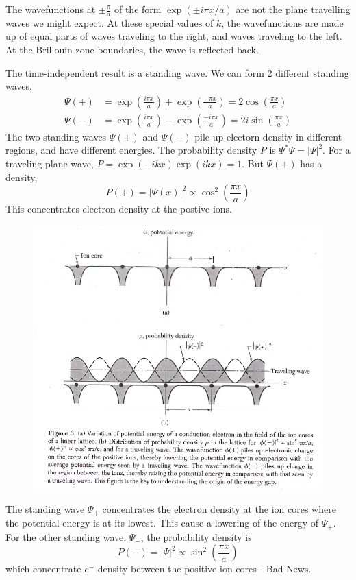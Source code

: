 \documentclass[a4paper, 11pt, normalem]{report}
\begin{document}
The wavefunctions at $\pm \frac{\pi}{a}$ of the form $\exp{(\pm i\pi x/a)}$ are not the plane travelling waves we might expect.
At these special values of $k$, the wavefunctions are made up of equal parts of waves traveling to the right, and waves traveling to the left. 
At the Brillouin zone boundaries, the wave is reflected back. 

The time-independent result is a standing wave.
We can form 2 different standing waves,
\begin{align}
    \Psi(+) &= \exp{\left(\frac{i\pi x}{a}\right)}  + \exp\left(\frac{-\pi x}{a}\right) = 2\cos\left(\frac{\pi x}{a}\right) \\
    \Psi(-) &= \exp\left(\frac{i\pi x}{a}\right) - \exp\left(\frac{-i\pi x}{a}\right) = 2i\sin\left(\frac{\pi x}{a}\right) 
\end{align}
The two standing waves $\Psi(+)$ and $\Psi(-)$ pile up electorn density in different regions, and have different energies. 
The probability density $P$ is $\Psi^*\Psi = |\Psi|^2$.
For a traveling plane wave, $P = \exp(-ikx)\exp(ikx) = 1$.
But $\Psi(+)$ has a density, 
\begin{equation}
    P(+) = |\Psi(x)|^2 \propto \cos^2\left(\frac{\pi x}{a}\right)
\end{equation}
This concentrates electron density at the postive ions. 
\begin{figure}[H]
    \centering
    \includegraphics[scale=0.5]{l2f3.png}
\end{figure}
The standing wave $\Psi_+$ concentrates the electron density at the ion cores where the potential energy is at its lowest. 
This cause a lowering of the energy of $\Psi_+$.
For the other standing wave, $\Psi_-$, the probability density is
\begin{equation}
    P(-) = |\Psi|^2 \propto \sin^2\left(\frac{\pi x}{a}\right)
\end{equation}
which concentrate $e^-$ density between the positive ion cores - Bad News. 
\end{document}
